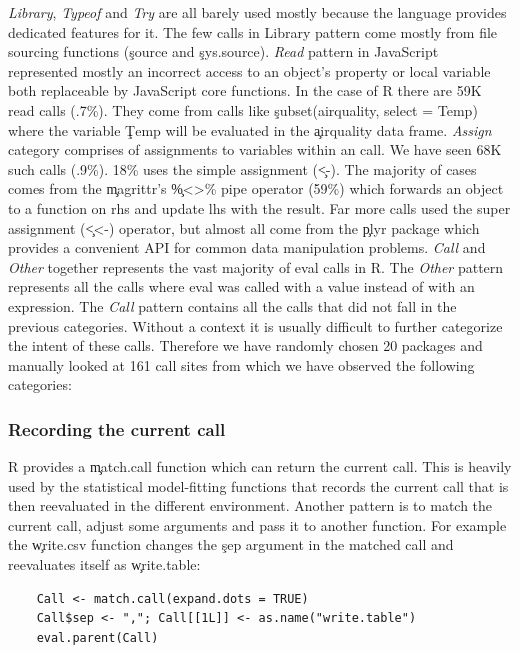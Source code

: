 \documentclass[conference]{IEEEtran}
\newcommand{\PatternReadRnd}{59K\xspace}
\newcommand{\PatternReadRatio}{.7\%\xspace}
\newcommand{\PatternAssignRnd}{68K\xspace}
\newcommand{\PatternAssignRatio}{.9\%\xspace}
\newcommand{\PatternAssignArrowRatio}{18\%\xspace}
\newcommand{\PatternAssignArrowMagrittrRatio}{59\%\xspace}
\newcommand{\PatternManualPackages}{20\xspace}
\newcommand{\PatternManualCallsites}{161\xspace}
\begin{document}
\noindent \emph{Library}, \emph{Typeof} and \emph{Try} are all barely used
mostly because the language provides dedicated features for it. The few calls in
Library pattern come mostly from file sourcing functions (\ie \c{source} and \c{sys.source}).
%
\noindent \emph{Read} pattern in JavaScript represented mostly an incorrect
access to an object's property or local variable both replaceable by
JavaScript core functions. In the case of R there are \PatternReadRnd read
\eval calls (\PatternReadRatio). They come from calls like
\c{subset(airquality, select = Temp)} where the variable \c{Temp} will be
evaluated in the \c{airquality} data frame.
%
\noindent \emph{Assign} category comprises of assignments to variables
within an \eval call. We have seen \PatternAssignRnd such calls
(\PatternAssignRatio).  \PatternAssignArrowRatio uses the simple assignment
(\c{<-}). The majority of cases comes from the \c{magrittr}'s \c{\%<>\%}
pipe operator (\PatternAssignArrowMagrittrRatio) which forwards an object to
a function on rhs and update lhs with the result. Far more calls used the
super assignment (\c{<<-}) operator, but almost all come from the \c{plyr}
package which provides a convenient API for common data manipulation
problems.
%
\noindent \emph{Call} and \emph{Other} together represents the vast majority
of eval calls in R. The \emph{Other} pattern represents all the calls where
eval was called with a value instead of with an expression. The \emph{Call}
pattern contains all the calls that did not fall in the previous
categories. Without a context it is usually difficult to further categorize
the intent of these calls.  Therefore we have randomly chosen
\PatternManualPackages packages and manually looked at
\PatternManualCallsites call sites from which we have observed the following
categories:

\subsubsection{Recording the current call} R provides a \c{match.call} function
which can return the current call. This is heavily used by the statistical
model-fitting functions that records the current call that is then
reevaluated in the different environment. Another pattern is to match the
current call, adjust some arguments and pass it to another function. For
example the \c{write.csv} function changes the \c{sep} argument in the
matched call and reevaluates itself as \c{write.table}:
%
\begin{lstlisting}
    Call <- match.call(expand.dots = TRUE)
    Call$sep <- ","; Call[[1L]] <- as.name("write.table")
    eval.parent(Call)
\end{lstlisting}
\end{document}
